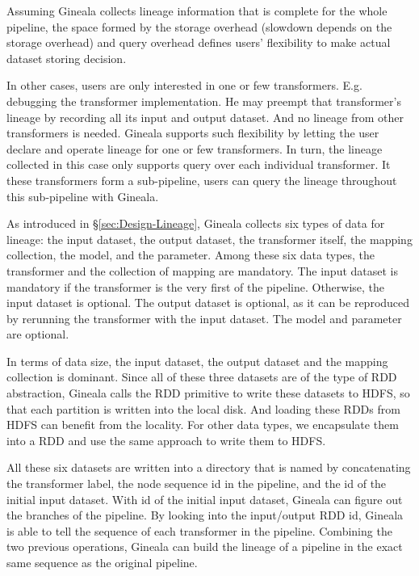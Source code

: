 \documentclass{sig-alternate}
\begin{document}
Assuming Gineala collects lineage information that is complete for the whole pipeline, the space formed by the storage overhead 
(slowdown depends on the storage overhead) and query overhead defines users' flexibility to make actual dataset storing decision.

In other cases, users are only interested in one or few transformers. E.g. debugging the transformer implementation.
He may preempt that transformer's lineage by recording all its input and output dataset. 
And no lineage from other transformers is needed.
Gineala supports such flexibility by letting the user declare and operate lineage for one or few transformers.
In turn, the lineage collected in this case only supports query over each individual transformer.
It these transformers form a sub-pipeline, users can query the lineage throughout this sub-pipeline with Gineala.

As introduced in \S\ref{sec:Design-Lineage}, Gineala collects six types of data for lineage: the input dataset, the output dataset,
the transformer itself, the mapping collection, the model, and the parameter.
Among these six data types, the transformer and the collection of mapping are mandatory. 
The input dataset is mandatory if the transformer is the very first of the pipeline. 
Otherwise, the input dataset is optional.
The output dataset is optional, as it can be reproduced by rerunning the transformer with the input dataset.
The model and parameter are optional.

In terms of data size, the input dataset, the output dataset and the mapping collection is dominant. 
Since all of these three datasets are of the type of RDD abstraction, Gineala calls the RDD primitive to write these datasets
to HDFS, so that each partition is written into the local disk. 
And loading these RDDs from HDFS can benefit from the locality.
For other data types, we encapsulate them into a RDD and use the same approach to write them to HDFS.

All these six datasets are written into a directory that is named by concatenating the transformer label, 
the node sequence id in the pipeline, and the id of the initial input dataset. 
With id of the initial input dataset, Gineala can figure out the branches of the pipeline.
By looking into the input/output RDD id, Gineala is able to tell the sequence of each transformer in the pipeline.
Combining the two previous operations, Gineala can build the lineage of a pipeline in the exact same sequence
as the original pipeline.
\end{document}
